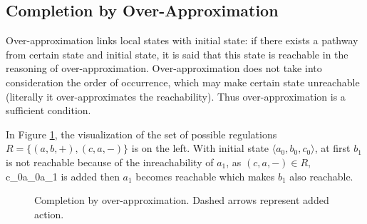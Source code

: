 \subsection{Completion by Over-Approximation}
Over-approximation links local states with initial state: if there exists a pathway from certain state and initial state, it is said that this state is reachable in the reasoning of over-approximation. Over-approximation does not take into consideration the order of occurrence, which may make certain state unreachable (literally it over-approximates the reachability). Thus over-approximation is a sufficient condition.

In Figure \ref{CompOv}, the visualization of the set of possible regulations $R=\{(a,b,+),(c,a,-)\}$ is on the left. With initial state $\langle a_0,b_0,c_0\rangle$, at first $b_1$ is not reachable because of the inreachability of $a_1$, as $(c,a,-)\in R$, \ac{c_0}{a_0}{a_1} is added then $a_1$ becomes reachable which makes $b_1$ also reachable.

\begin{figure}[ht]
\centering
{}\qquad
{}
\caption[Completion by over-approximation]{Completion by over-approximation. Dashed arrows represent added action.}\label{CompOv}
\end{figure}


